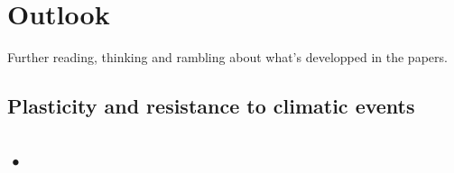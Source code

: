 

\chapter{Outlook}

Further reading, thinking and rambling about what's developped in the papers.

\section{Plasticity and resistance to climatic events}

\section{•}